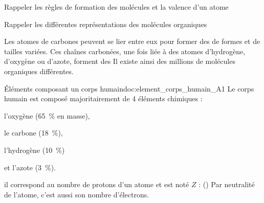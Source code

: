 \teteTermStssOrga

\vspace*{-30pt}

\begin{objectifs}
  \item Rappeler les règles de formation des molécules et la valence d'un atome
  \item Rappeler les différentes représentations des molécules organiques
\end{objectifs}

\begin{contexte}
  Les atomes de carbones peuvent se lier entre eux pour former des  de formes et de tailles variées.
  Ces chaînes carbonées, une fois liée à des atomes d'hydrogène, d'oxygène ou d'azote, forment des 
  Il existe ainsi des millions de molécules organiques différentes.

\end{contexte}


\vspace*{-8pt}
\vspace*{-8pt}

\begin{doc}{Éléments composant un corps humain}{doc:element_corps_humain_A1}
  Le corps humain est composé majoritairement de 4 éléments chimiques :
  \vspace*{-4pt}
  \begin{multicols}{2}
  \begin{listePoints}
    \item l'oxygène   \oxygene (\qty{65}{\percent} en masse),
    \item le carbone  \carbone (\qty{18}{\percent}),
    \item l'hydrogène \hydrogene (\qty{10}{\percent})
    \item et l'azote   (\qty{3}{\percent}).
  \end{listePoints}
  \end{multicols}
  
  \begin{importants}
     il correspond au nombre de protons d'un atome et est noté $Z$ :  (\hspace{-8pt}\exemple {})
    Par neutralité de l'atome, c'est aussi son nombre d'électrons.
  \end{importants}
\end{doc}

